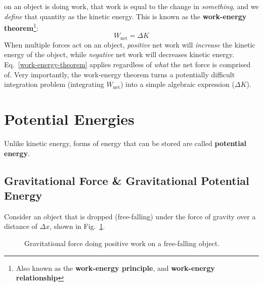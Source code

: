on an object is doing work, that work is equal to the change in
\emph{something}, and we \emph{define} that quantity as the kinetic energy.
This is known as the \textbf{work-energy theorem}\footnote{Also known as the
\textbf{work-energy principle}, and \textbf{work-energy relationship}}:
\begin{equation}
  \boxed{
    W_\text{net}=\Delta K
  }
  \label{work-energy-theorem}
\end{equation}
When multiple forces act on an object, \emph{positive} net work will
\emph{increase} the kinetic energy of the object, while \emph{negative} net
work will decreases kinetic energy. Eq.~\ref{work-energy-theorem} applies
regardless of \emph{what} the net force is comprised of. Very importantly, the
work-energy theorem turns a potentially difficult integration problem
(integrating $W_\text{net}$) into a simple algebraic expression ($\Delta K$).



\section{Potential Energies}

Unlike kinetic energy, forms of energy that can be stored are called
\textbf{potential energy}.

\subsection{Gravitational Force \& Gravitational Potential Energy}
\label{section:gravitationalPE}

Consider an object that is dropped (free-falling) under the force of gravity
over a distance of $\Delta x$, shown in Fig.~\ref{fig:falling1}.
\begin{figure}[ht]
  \centering
  \caption{Gravitational force doing positive work on a free-falling object.}
  \label{fig:falling1}
\end{figure}

